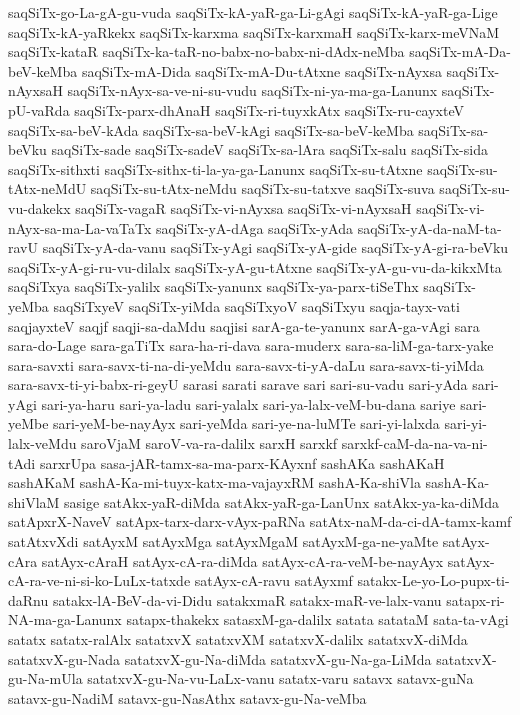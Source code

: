 {saqSiTx-go-La-gA-gu-vuda
saqSiTx-kA-yaR-ga-Li-gAgi
saqSiTx-kA-yaR-ga-Lige
saqSiTx-kA-yaRkekx
saqSiTx-karxma
saqSiTx-karxmaH
saqSiTx-karx-meVNaM
saqSiTx-kataR
saqSiTx-ka-taR-no-babx-no-babx-ni-dAdx-neMba
saqSiTx-mA-Da-beV-keMba
saqSiTx-mA-Dida
saqSiTx-mA-Du-tAtxne
saqSiTx-nAyxsa
saqSiTx-nAyxsaH
saqSiTx-nAyx-sa-ve-ni-su-vudu
saqSiTx-ni-ya-ma-ga-Lanunx
saqSiTx-pU-vaRda
saqSiTx-parx-dhAnaH
saqSiTx-ri-tuyxkAtx
saqSiTx-ru-cayxteV
saqSiTx-sa-beV-kAda
saqSiTx-sa-beV-kAgi
saqSiTx-sa-beV-keMba
saqSiTx-sa-beVku
saqSiTx-sade
saqSiTx-sadeV
saqSiTx-sa-lAra
saqSiTx-salu
saqSiTx-sida
saqSiTx-sithxti
saqSiTx-sithx-ti-la-ya-ga-Lanunx
saqSiTx-su-tAtxne
saqSiTx-su-tAtx-neMdU
saqSiTx-su-tAtx-neMdu
saqSiTx-su-tatxve
saqSiTx-suva
saqSiTx-su-vu-dakekx
saqSiTx-vagaR
saqSiTx-vi-nAyxsa
saqSiTx-vi-nAyxsaH
saqSiTx-vi-nAyx-sa-ma-La-vaTaTx
saqSiTx-yA-dAga
saqSiTx-yAda
saqSiTx-yA-da-naM-ta-ravU
saqSiTx-yA-da-vanu
saqSiTx-yAgi
saqSiTx-yA-gide
saqSiTx-yA-gi-ra-beVku
saqSiTx-yA-gi-ru-vu-dilalx
saqSiTx-yA-gu-tAtxne
saqSiTx-yA-gu-vu-da-kikxMta
saqSiTxya
saqSiTx-yalilx
saqSiTx-yanunx
saqSiTx-ya-parx-tiSeThx
saqSiTx-yeMba
saqSiTxyeV
saqSiTx-yiMda
saqSiTxyoV
saqSiTxyu
saqja-tayx-vati
saqjayxteV
saqjf
saqji-sa-daMdu
saqjisi
sarA-ga-te-yanunx
sarA-ga-vAgi
sara
sara-do-Lage
sara-gaTiTx
sara-ha-ri-dava
sara-muderx
sara-sa-liM-ga-tarx-yake
sara-savxti
sara-savx-ti-na-di-yeMdu
sara-savx-ti-yA-daLu
sara-savx-ti-yiMda
sara-savx-ti-yi-babx-ri-geyU
sarasi
sarati
sarave
sari
sari-su-vadu
sari-yAda
sari-yAgi
sari-ya-haru
sari-ya-ladu
sari-yalalx
sari-ya-lalx-veM-bu-dana
sariye
sari-yeMbe
sari-yeM-be-nayAyx
sari-yeMda
sari-ye-na-luMTe
sari-yi-lalxda
sari-yi-lalx-veMdu
saroVjaM
saroV-va-ra-dalilx
sarxH
sarxkf
sarxkf-caM-da-na-va-ni-tAdi
sarxrUpa
sasa-jAR-tamx-sa-ma-parx-KAyxnf
sashAKa
sashAKaH
sashAKaM
sashA-Ka-mi-tuyx-katx-ma-vajayxRM
sashA-Ka-shiVla
sashA-Ka-shiVlaM
sasige
satAkx-yaR-diMda
satAkx-yaR-ga-LanUnx
satAkx-ya-ka-diMda
satApxrX-NaveV
satApx-tarx-darx-vAyx-paRNa
satAtx-naM-da-ci-dA-tamx-kamf
satAtxvXdi
satAyxM
satAyxMga
satAyxMgaM
satAyxM-ga-ne-yaMte
satAyx-cAra
satAyx-cAraH
satAyx-cA-ra-diMda
satAyx-cA-ra-veM-be-nayAyx
satAyx-cA-ra-ve-ni-si-ko-LuLx-tatxde
satAyx-cA-ravu
satAyxmf
satakx-Le-yo-Lo-pupx-ti-daRnu
satakx-lA-BeV-da-vi-Didu
satakxmaR
satakx-maR-ve-lalx-vanu
satapx-ri-NA-ma-ga-Lanunx
satapx-thakekx
satasxM-ga-dalilx
satata
satataM
sata-ta-vAgi
satatx
satatx-ralAlx
satatxvX
satatxvXM
satatxvX-dalilx
satatxvX-diMda
satatxvX-gu-Nada
satatxvX-gu-Na-diMda
satatxvX-gu-Na-ga-LiMda
satatxvX-gu-Na-mUla
satatxvX-gu-Na-vu-LaLx-vanu
satatx-varu
satavx
satavx-guNa
satavx-gu-NadiM
satavx-gu-NasAthx
satavx-gu-Na-veMba
}
